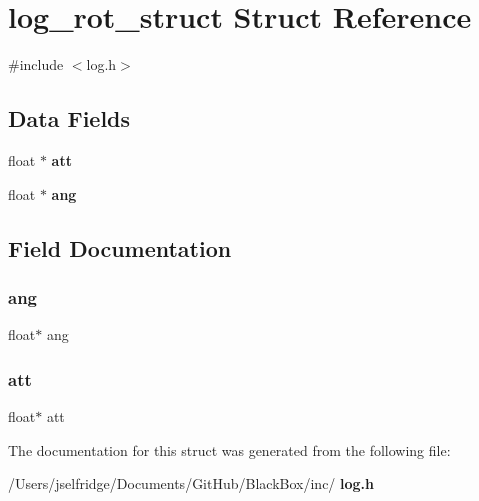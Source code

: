 \section{log\+\_\+rot\+\_\+struct Struct Reference}
\label{structlog__rot__struct}


{\ttfamily \#include $<$log.\+h$>$}

\subsection*{Data Fields}
\begin{DoxyCompactItemize}
\item 
float $\ast$ \textbf{ att}
\item 
float $\ast$ \textbf{ ang}
\end{DoxyCompactItemize}


\subsection{Field Documentation}
\mbox{\label{structlog__rot__struct_afa20b6f2b89b0fd9624735904a7d36d9}} 
\subsubsection{ang}
{\footnotesize\ttfamily float$\ast$ ang}

\mbox{\label{structlog__rot__struct_a6a738abccfecb54953372f19b5798d53}} 
\subsubsection{att}
{\footnotesize\ttfamily float$\ast$ att}



The documentation for this struct was generated from the following file\+:\begin{DoxyCompactItemize}
\item 
/\+Users/jselfridge/\+Documents/\+Git\+Hub/\+Black\+Box/inc/\textbf{ log.\+h}\end{DoxyCompactItemize}
